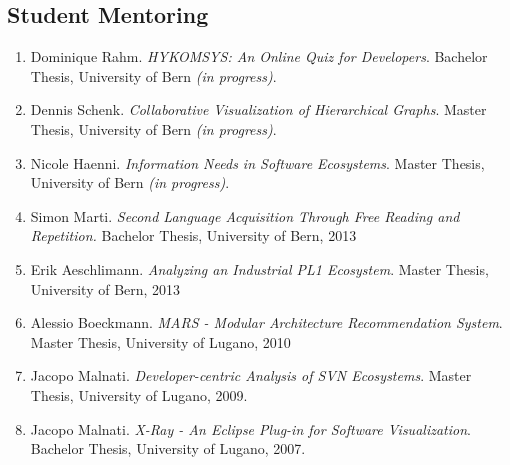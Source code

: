\subsection{Student Mentoring}

\begin{enumerate}

\item Dominique Rahm. \emph {HYKOMSYS: An Online Quiz for Developers}. Bachelor Thesis,  University of Bern \emph{(in progress)}.

\item Dennis Schenk. \emph{Collaborative Visualization of Hierarchical Graphs}. Master Thesis, University of Bern \emph{(in progress)}.

\item Nicole Haenni. \emph {Information Needs in Software Ecosystems}. Master Thesis, University of Bern \emph{(in progress)}.

\item Simon Marti. \emph{Second Language Acquisition Through Free Reading and Repetition.} Bachelor Thesis, University of Bern, 2013

\item Erik Aeschlimann. \emph {Analyzing an Industrial PL1 Ecosystem}. Master Thesis, University of Bern, 2013

\item Alessio Boeckmann. \emph{MARS - Modular Architecture Recommendation System}. Master Thesis, University of Lugano, 2010

\item Jacopo Malnati. \emph{Developer-centric Analysis of SVN Ecosystems}. Master Thesis, University of Lugano, 2009.

\item Jacopo Malnati. \emph{X-Ray - An Eclipse Plug-in for Software Visualization}. Bachelor Thesis, University of Lugano, 2007.

\end{enumerate}
